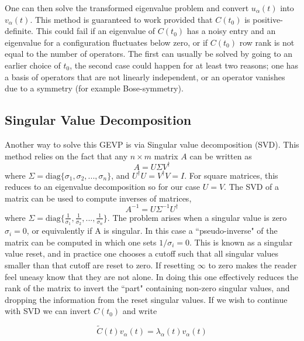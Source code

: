 \documentclass[onecolumn,article,preprintnumbers]{revtex4-1}
\begin{document}
One can then solve the transformed eigenvalue problem and convert $u_{\alpha}(t)$ into $v_{\alpha}(t)$. This method is guaranteed to work provided that $C(t_0)$ is positive-definite. This could fail if an eigenvalue of $C(t_0)$ has a noisy entry and an eigenvalue for a configuration fluctuates below zero, or if $C(t_0)$ row rank is not equal to the number of operators. The first can usually be solved by going to an earlier choice of $t_0$, the second case could happen for at least two reasons; one has a basis of operators that are not linearly independent, or an operator vanishes due to a symmetry (for example Bose-symmetry).

\subsection{Singular Value Decomposition}

Another way to solve this GEVP is via Singular value decomposition (SVD). This method relies on the fact that any $n\times m$ matrix $A$ can be written as 
\begin{equation}
A = U\Sigma V^{\dag}
\end{equation}
where $\Sigma =\text{diag}\{\sigma_1,\sigma_2,...,\sigma_n\}$, and $U^{\dag}U=V^{\dag}V=I$. For square matrices, this reduces to an eigenvalue decomposition so for our case $U=V$. The SVD of a matrix can be used to compute inverses of matrices,
\begin{equation}
A^{-1} = U\Sigma^{-1}U^{\dag}
\end{equation}
where $\Sigma =\text{diag}\{\frac{1}{\sigma_1},\frac{1}{\sigma_2},...,\frac{1}{\sigma_n}\}$. The problem arises when a singular value is zero $\sigma_i=0$, or equivalently if A is singular. In this case a ``pseudo-inverse" of the matrix can be computed in which one sets $1/\sigma_i=0$. This is known as a singular value reset, and in practice one chooses a cutoff such that all singular values smaller than that cutoff are reset to zero. If resetting $\infty$ to zero makes the reader feel uneasy know that they are not alone. In doing this one effectively  reduces the rank of the matrix to invert the ``part" containing non-zero singular values, and dropping the information from the reset singular values. If we wish to continue with SVD we can invert $C(t_0)$ and write

\begin{equation}
\tilde{C}(t)v_{\alpha}(t)=\lambda_{\alpha}(t)v_{\alpha}(t)
\end{equation}
\end{document}

